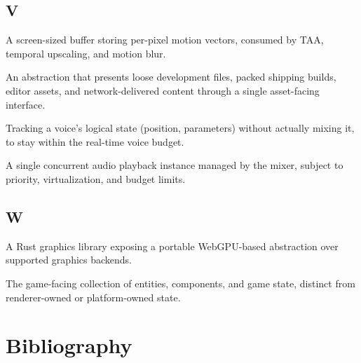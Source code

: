 \documentclass[
  11pt,
  letterpaper,
  DIV=11,
  numbers=noendperiod,
  twoside,
  open=right]{scrreprt}
\providecommand{\tightlist}{%
  \setlength{\itemsep}{0pt}\setlength{\parskip}{0pt}}
\begin{document}
\section*{V}\label{v}


\begin{description}
\tightlist
\item[\textbf{Velocity buffer}]
A screen-sized buffer storing per-pixel motion vectors, consumed by TAA,
temporal upscaling, and motion blur.
\item[\textbf{Virtual filesystem}]
An abstraction that presents loose development files, packed shipping
builds, editor assets, and network-delivered content through a single
asset-facing interface.
\item[\textbf{Virtualization (audio)}]
Tracking a voice's logical state (position, parameters) without actually
mixing it, to stay within the real-time voice budget.
\item[\textbf{Voice (audio)}]
A single concurrent audio playback instance managed by the mixer,
subject to priority, virtualization, and budget limits.
\end{description}

\section*{W}\label{w}


\begin{description}
\tightlist
\item[\textbf{wgpu}]
A Rust graphics library exposing a portable WebGPU-based abstraction
over supported graphics backends.
\item[\textbf{World}]
The game-facing collection of entities, components, and game state,
distinct from renderer-owned or platform-owned state.
\end{description}

\chapter{Bibliography}\label{bibliography}
\end{document}
